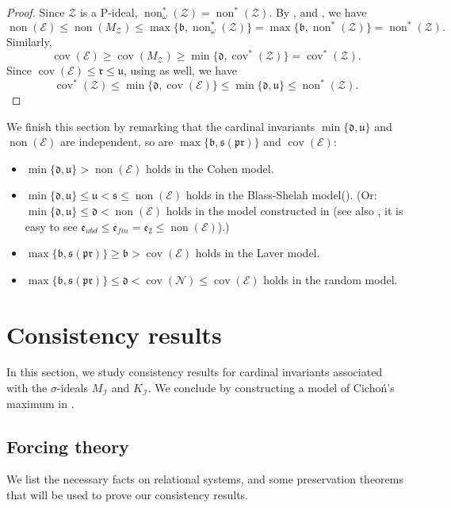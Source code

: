 \documentclass[a4paper,12pt]{amsart}
\theoremstyle{definition}
\numberwithin{thm}{section}
\numberwithin{equation}{section}
\newcommand{\bb}{\mathfrak{b}}
\newcommand{\dd}{\mathfrak{d}}
\newcommand{\ee}{\mathfrak{e}}
\newcommand{\rr}{\mathfrak{r}}
\newcommand{\uu}{\mathfrak{u}}
\DeclareMathOperator{\non}{non}
\DeclareMathOperator{\cov}{cov}
\newcommand{\covn}{\cov(\mathcal{N})}
\newcommand{\none}{\non(\mathcal{E})}
\newcommand{\cove}{\cov(\mathcal{E})}
\newcommand{\I}{\mathscr{I}}
\newcommand{\Z}{\mathcal{Z}}
\begin{document}
    \begin{proof}
        Since $\Z$ is a P-ideal, $\non^*_\omega(\Z)=\non^*(\Z)$. By ,  and , we have
        \[
        \none\leq\non(M_{\Z})\leq\max\{\bb,\non^*_\omega(\Z)\}=\max\{\bb,\non^*(\Z)\}=\non^*(\Z).
        \]
        Similarly,
        \[
        \cov(\mathcal{E})\geq\cov(M_\Z)\geq\min\{\dd, \cov^*(\Z)\}=\cov^*(\Z).
        \]
        Since $\cove\leq\rr\leq\uu$, using  as well, we have
        \[
        \cov^*(\Z) \leq \min\{\dd, \cove\} \leq \min\{\dd, \uu\} \leq \non^*(\Z).
        \]
    \end{proof}

    We finish this section by remarking that the cardinal invariants $\min\{\dd,\uu\}$ and $\none$ are independent, so are $\max\{\bb,\mathfrak{s}(\mathfrak{pr})\}$ and $\cove$: 
    \begin{itemize}
        \item $\min\{\dd,\uu\}>\none$ holds in the Cohen model. 
        \item $\min\{\dd,\uu\}\leq \uu<\mathfrak{s}\leq\none$ holds in the Blass-Shelah model(\cite{BS87}). (Or: $\min\{\dd,\uu\}\leq\dd<\none$ holds in the model constructed in \cite{She92} (see also \cite[Section 3.4, Theorem 1]{Bre95}, it is easy to see $\ee_{ubd}\leq\ee_{fin}=\ee_2\leq\none$).)
        \item $\max\{\bb,\mathfrak{s}(\mathfrak{pr})\}\geq\bb>\cove$ holds in the Laver model.
        \item $\max\{\bb,\mathfrak{s}(\mathfrak{pr})\}\leq\dd<\covn\leq\cove$ holds in the random model.
    \end{itemize}

    \section{Consistency results}\label{sec:Consistency}
    
    In this section, we study consistency results for cardinal invariants associated with the $\sigma$-ideals $M_\I$ and $K_\I$. We conclude by constructing a model of  Cicho\'n's maximum in .
    
    \subsection{Forcing theory}
    
    We list the necessary facts on relational systems, and some preservation theorems that will be used to prove our consistency results.
    
\end{document}
